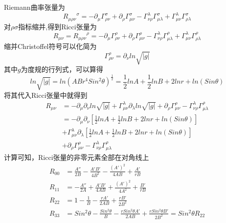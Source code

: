 	Riemann曲率张量为
	\begin{equation}
		  {R_{\mu\rho\nu}}^\sigma=-\partial_\mu\Gamma^\sigma_{\rho\nu}+\partial_\rho\Gamma^\sigma_{\mu\nu}-\Gamma^\lambda_{\nu\rho}\Gamma^\sigma_{\mu\lambda}+\Gamma^\lambda_{\mu\nu}\Gamma^\sigma_{\rho\lambda}
	\end{equation}
	对$\rho\sigma$指标缩并,得到Ricci张量为
	\begin{equation}
		  R_{\mu\nu}={R_{\mu\rho\nu}}^\rho=-\partial_\mu\Gamma^\rho_{\rho\nu}+\partial_\rho\Gamma^\rho_{\mu\nu}-\Gamma^\lambda_{\nu\rho}\Gamma^\rho_{\mu\lambda}+\Gamma^\lambda_{\mu\nu}\Gamma^\rho_{\rho\lambda}
	\end{equation}
	缩并Christoffel符号可以化简为
	\begin{equation}
		  \Gamma^\rho_{\rho\nu}=\partial_\nu ln\sqrt{|g|}
	\end{equation}
	其中$g$为度规的行列式，可以算得
	\begin{equation}
		  ln\sqrt{|g|}=ln(ABr^4Sin^2\theta)^\frac{1}{2}=\frac{1}{2}lnA+\frac{1}{2}lnB+2lnr+ln(Sin\theta)
	\end{equation}
	将其代入Ricci张量中就得到
	\begin{equation}
		  \begin{split}
				R_{\mu\nu}&=-\partial_\mu\partial_\nu ln\sqrt{|g|}+\Gamma^\lambda_{\mu\nu}\partial_\lambda ln\sqrt{|g|}+\partial_\rho\Gamma^\rho_{\mu\nu}-\Gamma^\lambda_{\nu\rho}\Gamma^\rho_{\mu\lambda}\\
				&=-\partial_\mu\partial_\nu \left[\frac{1}{2}lnA+\frac{1}{2}lnB+2lnr+ln(Sin\theta)\right]\\
				&+\Gamma^\lambda_{\mu\nu}\partial_\lambda \left[\frac{1}{2}lnA+\frac{1}{2}lnB+2lnr+ln(Sin\theta)\right]\\
				&+\partial_\rho\Gamma^\rho_{\mu\nu}-\Gamma^\lambda_{\nu\rho}\Gamma^\rho_{\mu\lambda}
		  \end{split}
	\end{equation}
	计算可知，Ricci张量的非零元素全部在对角线上
	\begin{equation}
		  \begin{split}
				R_{00}&=\frac{A''}{2B}-\frac{A'B'}{4B^2}-\frac{(A')^2}{4AB}+\frac{A'}{rB}\\
				R_{11}&=-\frac{A''}{2A}+\frac{A'B'}{4AB}+\frac{(A')^2}{4A^2}+\frac{B'}{rB}\\
				R_{22}&=1-\frac{1}{B}-\frac{rA'}{2AB}+\frac{rB'}{2B^2}\\
				R_{33}&=Sin^2\theta-\frac{Sin^2\theta}{B}-\frac{rSin^2\theta A'}{2AB}+\frac{rSin^2\theta B'}{2B^2}=Sin^2\theta R_{22}
		  \end{split}
	\end{equation}
